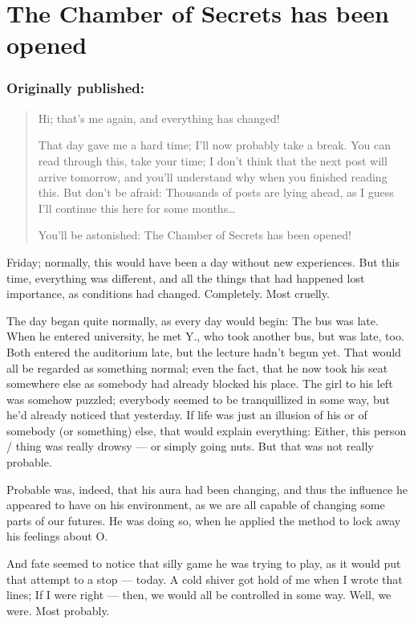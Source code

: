 \chapter{The Chamber of Secrets has been opened}
\label{cha:chamber-secrets-has-opened}
\subsection*{Originally published: }
\begin{quote}
Hi; that's me again, and everything has changed!

That day gave me a hard time; I'll now probably take a break. You can read through this, take your time; I don't think that the next post will arrive tomorrow, and you'll understand why when you finished reading this. 
But don't be afraid: Thousands of posts are lying ahead, as I guess I'll continue this here for some months\ldots

You'll be astonished: The Chamber of Secrets has been opened!
\end{quote}

Friday; normally, this would have been a day without new experiences. But this time, everything was different, and all the things that had happened lost importance, as conditions had changed. 
Completely. 
Most cruelly.

The day began quite normally, as every day would begin: The bus was late. 
When he entered university, he met Y., who took another bus, but was late, too. 
Both entered the auditorium late, but the lecture hadn't begun yet. 
That would all be regarded as something normal; even the fact, that he now took his seat somewhere else as somebody had already blocked his place. 
The girl to his left was somehow puzzled; everybody seemed to be tranquillized in some way, but he'd already noticed that yesterday. If life was just an illusion of his or of somebody (or something) else, that would explain everything: Either, this person / thing was really drowsy --- or simply going nuts. 
But that was not really probable.

Probable was, indeed, that his aura had been changing, and thus the influence he appeared to have on his environment, as we are all capable of changing some parts of our futures. 
He was doing so, when he applied the method to lock away his feelings about O.

And fate seemed to notice that silly game he was trying to play, as it would put that attempt to a stop --- today. 
A cold shiver got hold of me when I wrote that lines; If I were right --- then, we would all be controlled in some way. 
Well, we were. 
Most probably.


